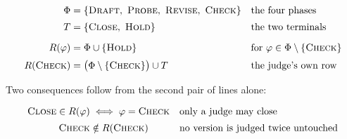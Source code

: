 %
%
\begin{align*}
  \Phi &= \{\textsc{Draft},\ \textsc{Probe},\ \textsc{Revise},\ \textsc{Check}\}
  &&\text{the four phases}\\[2pt]
  T &= \{\textsc{Close},\ \textsc{Hold}\}
  &&\text{the two terminals}\\[6pt]
  R(\varphi) &= \Phi \cup \{\textsc{Hold}\}
  &&\text{for } \varphi \in \Phi \setminus \{\textsc{Check}\}\\[2pt]
  R(\textsc{Check}) &= \bigl(\Phi \setminus \{\textsc{Check}\}\bigr) \cup T
  &&\text{the judge's own row}
\end{align*}

\medskip

\noindent Two consequences follow from the second pair of lines alone:

\begin{align*}
  \textsc{Close} \in R(\varphi)
    &\iff \varphi = \textsc{Check}
  &&\text{only a judge may close}\\[2pt]
  \textsc{Check} &\notin R(\textsc{Check})
  &&\text{no version is judged twice untouched}
\end{align*}
